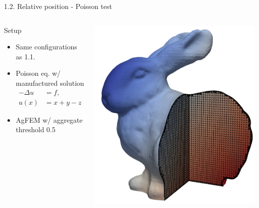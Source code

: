 \documentclass{beamer}
\begin{document}
\begin{frame}{1.2. Relative position - Poisson test}

  \begin{columns}

  \begin{block}{Setup}
    \begin{itemize}
      \item
        Same configurations as 1.1.
      \item
        Poisson eq. w/ manufactured solution
        \begin{align*}
          -\Delta u &= f,\\
          u(x) &= x+y-z
        \end{align*}
      \item
        AgFEM w/ aggregate threshold 0.5
    \end{itemize}
  \end{block}
  
  \centering
  \includegraphics[width=\textwidth]{bunny_poisson_cut}
  \end{columns}
\end{frame}
\end{document}
